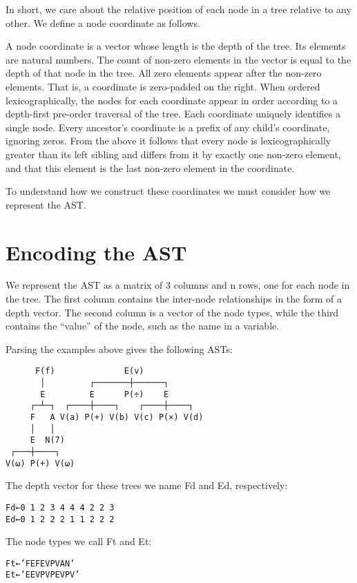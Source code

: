 \documentclass[pldi]{sigplanconf-pldi15}
\begin{document}
In short, we care about the relative position of each node in a tree relative to any other. We define a node 
coordinate as follows.

A node coordinate is a vector whose length is the depth of the tree. Its elements are natural numbers. 
The count of non-zero elements in the vector is equal to the depth of that node in the tree. All zero elements
appear after the non-zero elements. That is, a coordinate is zero-padded on the right. When ordered 
lexicographically, the nodes for each coordinate appear in order according to a depth-first pre-order 
traversal of the tree. Each coordinate uniquely identifies a single node. Every ancestor’s coordinate is a 
prefix of any child’s coordinate, ignoring zeros. From the above it follows that every node is lexicographically 
greater than its left sibling and differs from it by exactly one non-zero element, and that this element is the 
last non-zero element in the coordinate. 

To understand how we construct these coordinates we must consider how we represent the AST.
\section{Encoding the AST}

We represent the AST as a matrix of 3 columns and n rows, one for each node in the tree. The first column 
contains the inter-node relationships in the form of a depth vector. The second column is a vector of the 
node types, while the third contains the “value” of the node, such as the name in a variable. 

Parsing the examples above gives the following ASTs:

\begin{verbatim}
      F(f)              E(v)
       │         ┌───────┼──────┐
       E         E      P(÷)    E
     ┌─┴─┐  ┌────┼────┐    ┌────┼────┐
     F   A V(a) P(+) V(b) V(c) P(×) V(d)
     │   │
     E  N(7) 
 ┌───┼────┐
V(⍵) P(+) V(⍵)
\end{verbatim}

The depth vector for these trees we name Fd and Ed, respectively:

\begin{verbatim}
Fd←0 1 2 3 4 4 4 2 2 3
Ed←0 1 2 2 2 1 1 2 2 2
\end{verbatim}

The node types we call Ft and Et:

\begin{verbatim}
Ft←’FEFEVPVAN’
Et←’EEVPVPEVPV’
\end{verbatim}
\end{document}
